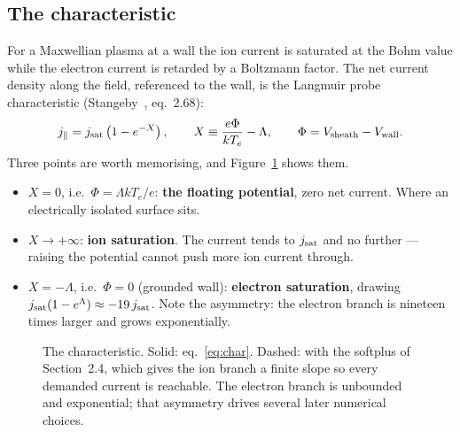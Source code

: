 \documentclass[11pt,a4paper]{article}
\begin{document}
\subsection{The characteristic}

For a Maxwellian plasma at a wall the ion current is saturated at the Bohm value while the electron
current is retarded by a Boltzmann factor. The net current density along the field, referenced to
the wall, is the Langmuir probe characteristic (Stangeby~\cite{stangeby}, eq.~2.68):
\begin{equation}
  j_\parallel = j_{\rm sat}\left(1 - e^{-X}\right),\qquad
  X \equiv \frac{e\Phi}{kT_e} - \Lambda,\qquad
  \Phi = V_{\rm sheath} - V_{\rm wall}.
  \label{eq:char}
\end{equation}
Three points are worth memorising, and Figure~\ref{fig:char} shows them.

\begin{itemize}\itemsep3pt
\item $X=0$, i.e.\ $\Phi=\Lambda kT_e/e$: \textbf{the floating potential}, zero net current. Where an
  electrically isolated surface sits.
\item $X\to+\infty$: \textbf{ion saturation}. The current tends to $j_{\rm sat}$ and no further ---
  raising the potential cannot push more ion current through.
\item $X=-\Lambda$, i.e.\ $\Phi=0$ (grounded wall): \textbf{electron saturation}, drawing
  $j_{\rm sat}(1-e^{\Lambda})\approx-19\,j_{\rm sat}$. Note the asymmetry: the electron branch is
  nineteen times larger and grows exponentially.
\end{itemize}

\begin{figure}[h]\centering
{}
\caption{The characteristic. Solid: eq.~\eqref{eq:char}. Dashed: with the softplus of Section~2.4,
which gives the ion branch a finite slope so every demanded current is reachable. The electron branch
is unbounded and exponential; that asymmetry drives several later numerical choices.}
\label{fig:char}
\end{figure}
\end{document}
